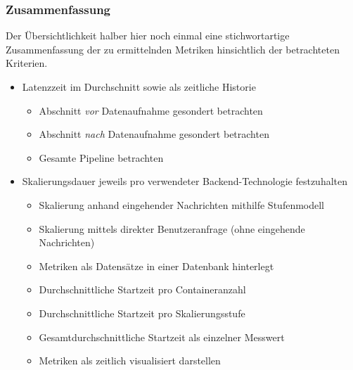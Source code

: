 \subsubsection{Zusammenfassung \checkmark}
Der Übersichtlichkeit halber hier noch einmal eine stichwortartige Zusammenfassung der zu ermittelnden Metriken hinsichtlich der betrachteten Kriterien.

\begin{itemize}
  \item Latenzzeit im Durchschnitt sowie als zeitliche Historie
  \begin{itemize}
    \item Abschnitt \emph{vor} Datenaufnahme gesondert betrachten
    \item Abschnitt \emph{nach} Datenaufnahme gesondert betrachten
    \item Gesamte Pipeline betrachten
  \end{itemize}
  \item Skalierungsdauer jeweils pro verwendeter Backend-Technologie festzuhalten
  \begin{itemize}
    \item Skalierung anhand eingehender Nachrichten mithilfe Stufenmodell
    \item Skalierung mittels direkter Benutzeranfrage (ohne eingehende Nachrichten)
    \item Metriken als Datensätze in einer Datenbank hinterlegt
    \item Durchschnittliche Startzeit pro Containeranzahl 
    \item Durchschnittliche Startzeit pro Skalierungsstufe 
    \item Gesamtdurchschnittliche Startzeit als einzelner Messwert
    \item Metriken als zeitlich visualisiert darstellen
  \end{itemize}
\end{itemize}